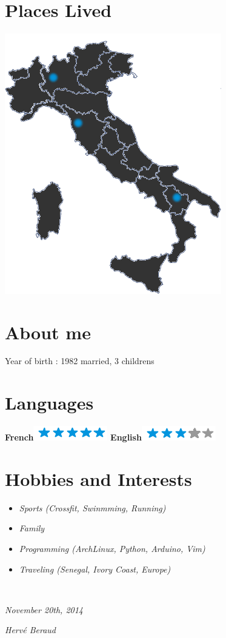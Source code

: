\documentclass[]{friggeri-cv}
\begin{document}
\begin{aside}
~
~
~
  \section{Places Lived}
    \includegraphics[scale=0.25]{img/italia.png}
    ~
  \section{About me}
    Year of birth : 1982
    married, 3 childrens 
    ~
  \section{Languages}
    \textbf{French}\includegraphics[scale=0.40]{img/5stars.png}
    \textbf{English}\includegraphics[scale=0.40]{img/3stars.png}
\end{aside}

\section{Hobbies and Interests}
\begin {itemize}
    \item \emph {Sports (Crossfit, Swinmming, Running)}
    \item \emph {Family}
    \item \emph {Programming (ArchLinux, Python, Arduino, Vim)}
    \item \emph {Traveling (Senegal, Ivory Coast, Europe)}
\end {itemize}

~
\begin{flushleft}
\emph{November 20th, 2014}
\end{flushleft}
\begin{flushright}
\emph{Hervé Beraud}
\end{flushright}
\end{document}
